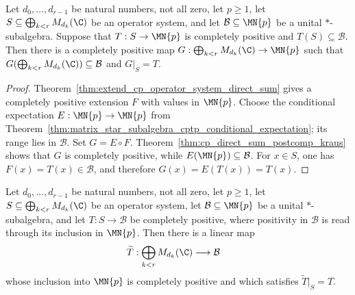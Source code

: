 \begin{theorem}
    \label{thm:extend_cp_operator_system_subalgebra_range}
    \leanok
    Let $d_0,\dots,d_{r-1}$ be natural numbers, not all zero, let $p\geq1$,
    let $S\subseteq\bigoplus_{k<r}M_{d_k}(\C)$ be an operator system, and let
    $\mathcal B\subseteq\MN{p}$ be a unital $*$-subalgebra. Suppose that
    $T:S\to\MN{p}$ is completely positive and $T(S)\subseteq\mathcal B$.
    Then there is a completely positive map
    $G:\bigoplus_{k<r}M_{d_k}(\C)\to\MN{p}$ such that
    $G(\bigoplus_{k<r}M_{d_k}(\C))\subseteq\mathcal B$ and $G|_S=T$.
\end{theorem}

\begin{proof}\leanok
    Theorem~\ref{thm:extend_cp_operator_system_direct_sum} gives a completely
    positive extension $F$ with values in $\MN{p}$. Choose the conditional
    expectation $E:\MN{p}\to\MN{p}$ from
    Theorem~\ref{thm:matrix_star_subalgebra_cptp_conditional_expectation}; its
    range lies in $\mathcal B$. Set $G=E\circ F$.
    Theorem~\ref{thm:cp_direct_sum_postcomp_kraus} shows that $G$ is completely
    positive, while $E(\MN{p})\subseteq\mathcal B$.
    For $x\in S$, one has $F(x)=T(x)\in\mathcal B$, and therefore
    $G(x)=E(T(x))=T(x)$.
\end{proof}

\begin{theorem}
    \label{thm:extend_cp_operator_system_star_subalgebra}
    \leanok
    Let $d_0,\dots,d_{r-1}$ be natural numbers, not all zero, let $p\geq1$,
    let $S\subseteq\bigoplus_{k<r}M_{d_k}(\C)$ be an operator system, let
    $\mathcal B\subseteq\MN{p}$ be a unital $*$-subalgebra, and let
    $T:S\to\mathcal B$ be completely positive, where positivity in
    $\mathcal B$ is read through its inclusion in $\MN{p}$. Then there is a
    linear map
    \begin{align}
        \widetilde T:
        \bigoplus_{k<r}M_{d_k}(\C)&\longrightarrow\mathcal B
    \end{align}
    whose inclusion into $\MN{p}$ is completely positive and which satisfies
    $\widetilde T|_S=T$.
\end{theorem}

